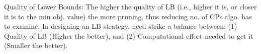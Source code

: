 Quality of Lower Bounds: The higher the quality of LB
(i.e., higher it is, or closer it is to the min obj. value) the more
pruning, thus reducing no. of CPs algo. has to examine. In designing
an LB strategy, need strike a balance between: (1) Quality
of LB (Higher the better), and (2) Computational effort needed
to get it (Smaller the better).
